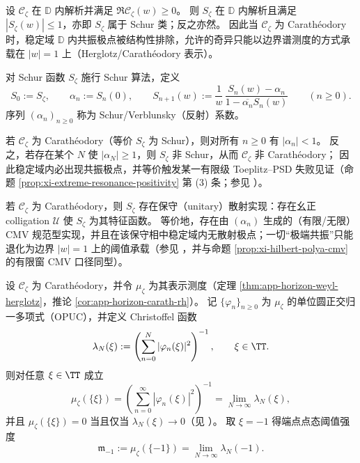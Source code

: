 \begin{theorem}\label{thm:xi-horizon-carath-schur-equivalence}
设 \(\mathscr{C}_{\zeta}\) 在 \(\mathbb{D}\) 内解析并满足 \(\Re \mathscr{C}_{\zeta}(w)\ge 0\)。
则 \(S_{\zeta}\) 在 \(\mathbb{D}\) 内解析且满足 \(|S_{\zeta}(w)|\le 1\)，亦即 \(S_{\zeta}\) 属于 Schur 类；反之亦然。
因此当 \(\mathscr{C}_{\zeta}\) 为 Carath\'eodory 时，稳定域 \(\mathbb{D}\) 内共振极点被结构性排除，允许的奇异只能以边界谱测度的方式承载在 \(|w|=1\) 上（Herglotz/Carath\'eodory 表示）。
\end{theorem}

\begin{definition}\label{def:xi-horizon-schur-parameters}
对 Schur 函数 \(S_{\zeta}\) 施行 Schur 算法，定义
\[
S_0:=S_{\zeta},\qquad \alpha_n:=S_n(0),\qquad
S_{n+1}(w):=\frac{1}{w}\,\frac{S_n(w)-\alpha_n}{1-\overline{\alpha_n}S_n(w)}\qquad(n\ge 0).
\]
序列 \((\alpha_n)_{n\ge 0}\) 称为 Schur/Verblunsky（反射）系数。
\end{definition}

\begin{theorem}[反射系数越界的有限否证器]\label{thm:xi-horizon-reflection-finite-witness}
若 \(\mathscr{C}_{\zeta}\) 为 Carath\'eodory（等价 \(S_{\zeta}\) 为 Schur），则对所有 \(n\ge 0\) 有 \(|\alpha_n|<1\)。
反之，若存在某个 \(N\) 使 \(|\alpha_N|\ge 1\)，则 \(S_{\zeta}\) 非 Schur，从而 \(\mathscr{C}_{\zeta}\) 非 Carath\'eodory；
因此稳定域内必出现共振极点，并等价触发某一有限级 Toeplitz--PSD 失败见证（命题 \ref{prop:xi-extreme-resonance-positivity} 第 (3) 条；参见 \cite{Simon2005OPUC1}）。
\end{theorem}

\begin{theorem}[保守实现与端点阈值承载]\label{thm:xi-horizon-conservative-realization}
若 \(\mathscr{C}_{\zeta}\) 为 Carath\'eodory，则 \(S_{\zeta}\) 存在保守（unitary）散射实现：存在幺正 colligation \(\mathcal U\) 使 \(S_{\zeta}\) 为其特征函数。
等价地，存在由 \((\alpha_n)\) 生成的（有限/无限）CMV 规范型实现，并且在该保守相中稳定域内无散射极点；一切“极端共振”只能退化为边界 \(|w|=1\) 上的阈值承载（参见 \cite{CanteroMoralVelazquez2003CMV,Simon2005OPUC1}，并与命题 \ref{prop:xi-hilbert-polya-cmv} 的有限窗 CMV 口径同型）。
\end{theorem}

\begin{theorem}\label{thm:xi-horizon-endpoint-atom-christoffel}
设 \(\mathscr{C}_{\zeta}\) 为 Carath\'eodory，并令 \(\mu_{\zeta}\) 为其表示测度（定理 \ref{thm:app-horizon-weyl-herglotz}，推论 \ref{cor:app-horizon-carath-rh}）。
记 \(\{\varphi_n\}_{n\ge 0}\) 为 \(\mu_{\zeta}\) 的单位圆正交归一多项式（OPUC），并定义 Christoffel 函数
\[
\lambda_N(\xi):=\left(\sum_{n=0}^{N}|\varphi_n(\xi)|^2\right)^{-1},\qquad \xi\in\TT.
\]
则对任意 \(\xi\in\TT\) 成立
\[
\mu_{\zeta}(\{\xi\})
=\left(\sum_{n=0}^{\infty}|\varphi_n(\xi)|^2\right)^{-1}
=\lim_{N\to\infty}\lambda_N(\xi),
\]
并且 \(\mu_{\zeta}(\{\xi\})=0\) 当且仅当 \(\lambda_N(\xi)\to 0\)（见 \cite{Simon2005OPUC1}）。
取 \(\xi=-1\) 得端点点态阈值强度
\[
\mathfrak m_{-1}:=\mu_{\zeta}(\{-1\})=\lim_{N\to\infty}\lambda_N(-1).
\]
\end{theorem}


